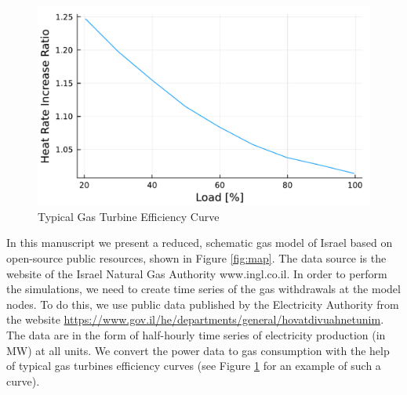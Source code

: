 \begin{figure}
    \centering
    \includegraphics[width=0.75\linewidth]{figs/gas_eff_curve.pdf}%
    \caption{Typical Gas Turbine Efficiency Curve}
    \label{fig:efficiency}
\end{figure}

In this manuscript we present a reduced, schematic gas model of Israel based on open-source public resources, shown in Figure \ref{fig:map}. The data source is the website of the Israel Natural Gas Authority www.ingl.co.il.
In order to perform the simulations, we need to create time series of the gas withdrawals at the model nodes. To do this, we use public data published by the Electricity Authority from the website \url{https://www.gov.il/he/departments/general/hovatdivuahnetunim}. The data are in the form of half-hourly time series of electricity production (in MW) at all units. We convert the power data to gas consumption with the help of typical gas turbines efficiency curves (see Figure \ref{fig:efficiency} for an example of such a curve). 